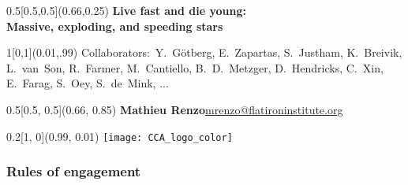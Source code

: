 \documentclass[xcolor=dvipsnames,professionalfonts, aspectratio=169]{beamer}
\begin{document}
\bgroup
{}
\begin{frame}[plain]
  \begin{textblock}{0.5}[0.5,0.5](0.66,0.25)
    \centering
    \textbf{\textcolor{white!80!Yellow}{{\Large Live fast and die
          young:\\}
        Massive, exploding, and speeding stars}}
  \end{textblock}

  \begin{textblock}{1}[0,1](0.01,.99)%
    \textcolor{white!80!Yellow}{\tiny
      Collaborators:~Y.~G\"otberg, E.~Zapartas, S.~Justham,
      K.~Breivik, L.~van~Son, R.~Farmer, M.~Cantiello,
      B.~D.~Metzger, D.~Hendricks,
      C.~Xin, E.~Farag, S.~Oey, S.~de~Mink, ...}
  \end{textblock}

  \begin{textblock}{0.5}[0.5, 0.5](0.66, 0.85)
    \centering
    \textcolor{white!80!Yellow}{\textbf{\large Mathieu
        Renzo}}\linebreak  \textcolor{whiteish}{\footnotesize\href{mailto:mrenzo@flatironinstitute.org}{mrenzo@flatironinstitute.org}}
  \end{textblock}

  \begin{textblock}{0.2}[1, 0](0.99, 0.01)
    \texttt{[image: CCA\_logo\_color]}
  \end{textblock}
\end{frame}
\egroup


\begin{frame}
  \frametitle{Rules of engagement}
\end{frame}


\bgroup
{}
\begin{frame}[plain]

\end{frame}
\egroup
\end{document}
